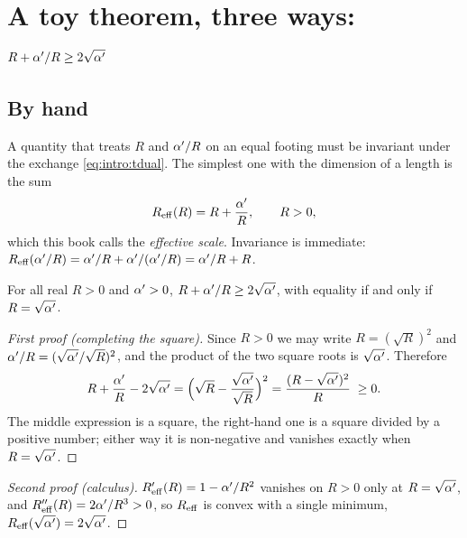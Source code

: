 \section{A toy theorem, three ways: \texorpdfstring{$R+\alpha'/R\ge 2\sqrt{\alpha'}$}{R + a'/R >= 2 sqrt a'}}
\label{sec:intro:amgm}

\subsection{By hand}

A quantity that treats $R$ and $\alpha'/R$ on an equal footing must be invariant under the
exchange \eqref{eq:intro:tdual}. The simplest one with the dimension of a length is the sum
\begin{equation}\label{eq:intro:reff}
  R_{\rm eff}(R)=R+\frac{\alpha'}{R},\qquad R>0 ,
\end{equation}
which this book calls the \emph{effective scale}. Invariance is immediate: $R_{\rm eff}(\alpha'/R)=\alpha'/R+\alpha'/(\alpha'/R)=\alpha'/R+R$.

\begin{proposition}\label{thm:intro:amgm}
For all real $R>0$ and $\alpha'>0$, $R+\alpha'/R\ge2\sqrt{\alpha'}$, with equality if and only if
$R=\sqrt{\alpha'}$.
\end{proposition}

\begin{proof}[First proof (completing the square)]
Since $R>0$ we may write $R=(\sqrt R)^2$ and $\alpha'/R=(\sqrt{\alpha'}/\sqrt R)^2$, and the product of
the two square roots is $\sqrt{\alpha'}$. Therefore
\begin{equation}\label{eq:intro:square}
  R+\frac{\alpha'}{R}-2\sqrt{\alpha'}=\Big(\sqrt R-\frac{\sqrt{\alpha'}}{\sqrt R}\Big)^{2}
  =\frac{(R-\sqrt{\alpha'})^2}{R}\;\ge 0 .
\end{equation}
The middle expression is a square, the right-hand one is a square divided by a positive
number; either way it is non-negative and vanishes exactly when $R=\sqrt{\alpha'}$.
\end{proof}

\begin{proof}[Second proof (calculus)]
$R_{\rm eff}'(R)=1-\alpha'/R^2$ vanishes on $R>0$ only at $R=\sqrt{\alpha'}$, and
$R_{\rm eff}''(R)=2\alpha'/R^3>0$, so $R_{\rm eff}$ is convex with a single minimum,
$R_{\rm eff}(\sqrt{\alpha'})=2\sqrt{\alpha'}$.
\end{proof}

